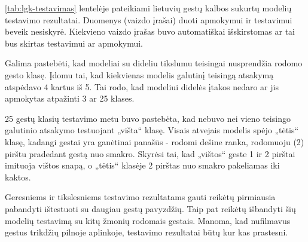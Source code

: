 \documentclass{VUMIFPSbakalaurinis}
\begin{document}
\ref{tab:lgk-testavimas} lentelėje pateikiami lietuvių gestų kalbos sukurtų modelių testavimo rezultatai. Duomenys (vaizdo įrašai) duoti apmokymui ir testavimui beveik nesiskyrė. Kiekvieno vaizdo įrašas buvo automatiškai išskirstomas ar tai bus skirtas testavimui ar apmokymui. 

Galima pastebėti, kad modeliai su dideliu tikslumu teisingai nusprendžia rodomo gesto klasę. Įdomu tai, kad kiekvienas modelis galutinį teisingą atsakymą atspėdavo 4 kartus iš 5. Tai rodo, kad modeliui didelės įtakos nedaro ar jis apmokytas atpažinti 3 ar 25 klases. 

25 gestų klasių testavimo metu buvo pastebėta, kad nebuvo nei vieno teisingo galutinio atsakymo testuojant „višta“ klasę. Visais atvejais modelis spėjo „tėtis“ klasę, kadangi gestai yra ganėtinai panašūs - rodomi dešine ranka, rodomuoju (2) pirštu pradedant gestą nuo smakro. Skyrėsi tai, kad „vištos“ geste 1 ir 2 pirštai imituoja vištos snapą, o „tėtis“ klasėje 2 pirštas nuo smakro pakeliamas iki kaktos. 

Geresniems ir tikslesniems testavimo rezultatams gauti reikėtų pirmiausia pabandyti ištestuoti su daugiau gestų pavyzdžių. Taip pat reikėtų išbandyti šių modelių testavimą su kitų žmonių rodomais gestais. Manoma, kad nufilmavus gestus trikdžių pilnoje aplinkoje, testavimo rezultatai būtų kur kas prastesni. 


\end{document}
